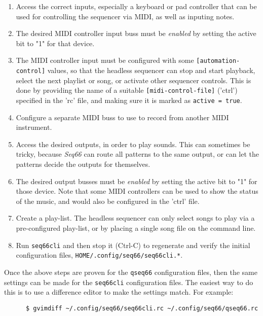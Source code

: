    \begin{enumerate}
      \item Access the correct inputs, especially a keyboard or pad controller
         that can be used for controlling the sequencer via MIDI, as well as
         inputing notes.
      \item The desired MIDI controller input buss must be \textsl{enabled}
         by setting the active bit to "1" for that device.
      \item The MIDI controller input must be configured with some
         \texttt{[automation-control]}
         values, so that the headless sequencer can stop and
         start playback, select the next playlist or song, or activate other
         sequencer controls.
         This is done by providing the name of a suitable
         \texttt{[midi-control-file]} ('ctrl') specified in the 'rc' file,
         and making sure it is marked as \texttt{active = true}.
      \item Configure a separate MIDI buss to use to record from another
         MIDI instrument.
      \item Access the desired outputs, in order to play sounds.  This can
         sometimes be tricky, because \textsl{Seq66} can route all
         patterns to the same output, or can let the patterns decide the
         outputs for themselves.
      \item The desired output busses must be \textsl{enabled} by setting
         the active bit to "1" for those device.
         Note that some MIDI controllers can be used to show
         the status of the music, and would also be configured in
         the 'ctrl' file.
      \item Create a play-list.  The headless sequencer can only select
         songs to play via a pre-configured play-list, or by placing
         a single song file on the command line.
      \item Run \texttt{seq66cli} and then stop it (Ctrl-C) to regenerate
         and verify the initial configuration files,
         \texttt{HOME/.config/seq66/seq66cli.*}.
   \end{enumerate}

   Once the above steps are proven for the \texttt{qseq66} configuration files,
   then the same settings can be made for the \texttt{seq66cli} configuration
   files.
   The easiest way to do this is to use a difference editor to
   make the settings match.  For example:

   \begin{verbatim}
      $ gvimdiff ~/.config/seq66/seq66cli.rc ~/.config/seq66/qseq66.rc
   \end{verbatim}

